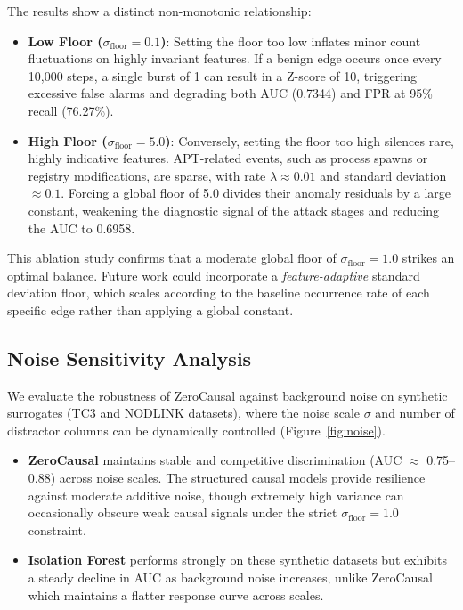 The results show a distinct non-monotonic relationship:
\begin{itemize}
\item \textbf{Low Floor ($\sigma_{\text{floor}} = 0.1$)}: Setting the floor too low inflates minor count fluctuations on highly invariant features. If a benign edge occurs once every 10,000 steps, a single burst of 1 can result in a Z-score of 10, triggering excessive false alarms and degrading both AUC (0.7344) and FPR at 95\% recall (76.27\%).
\item \textbf{High Floor ($\sigma_{\text{floor}} = 5.0$)}: Conversely, setting the floor too high silences rare, highly indicative features. APT-related events, such as process spawns or registry modifications, are sparse, with rate $\lambda \approx 0.01$ and standard deviation $\approx 0.1$. Forcing a global floor of 5.0 divides their anomaly residuals by a large constant, weakening the diagnostic signal of the attack stages and reducing the AUC to 0.6958.
\end{itemize}
This ablation study confirms that a moderate global floor of $\sigma_{\text{floor}} = 1.0$ strikes an optimal balance. Future work could incorporate a \textit{feature-adaptive} standard deviation floor, which scales according to the baseline occurrence rate of each specific edge rather than applying a global constant.

\subsection{Noise Sensitivity Analysis}
\label{sec:noise}
We evaluate the robustness of ZeroCausal against background noise on synthetic surrogates (TC3 and NODLINK datasets), where the noise scale $\sigma$ and number of distractor columns can be dynamically controlled (Figure~\ref{fig:noise}).
\begin{itemize}
\item \textbf{ZeroCausal} maintains stable and competitive discrimination (AUC $\approx$ 0.75--0.88) across noise scales. The structured causal models provide resilience against moderate additive noise, though extremely high variance can occasionally obscure weak causal signals under the strict $\sigma_{\text{floor}} = 1.0$ constraint.
\item \textbf{Isolation Forest} performs strongly on these synthetic datasets but exhibits a steady decline in AUC as background noise increases, unlike ZeroCausal which maintains a flatter response curve across scales.
\end{itemize}

